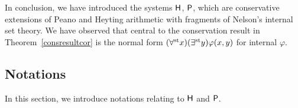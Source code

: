 \documentclass[reqno]{amsart}
\newtheorem{thm}{Theorem}
\newcommand\be{\begin{equation}}
\newcommand\ee{\end{equation}}
\def\H{\textup{\textsf{H}}}
\def\P{\textup{\textsf{P}}}
\def\st{\textup{st}}
\def\di{\rightarrow}
\numberwithin{equation}{section}
\numberwithin{thm}{section}
\begin{document}
\medskip

In conclusion, we have introduced the systems $\H$, $\P$, which are conservative extensions of Peano and Heyting arithmetic with fragments of Nelson's internal set theory.  
We have observed that central to the conservation result in Theorem~\ref{consresultcor} is the normal form $(\forall^{\st}x)(\exists^{\st}y)\varphi(x, y)$ for internal $\varphi$.  

\subsection{Notations}
In this section, we introduce notations relating to $\H$ and $\P$.  

\medskip
\end{document}
